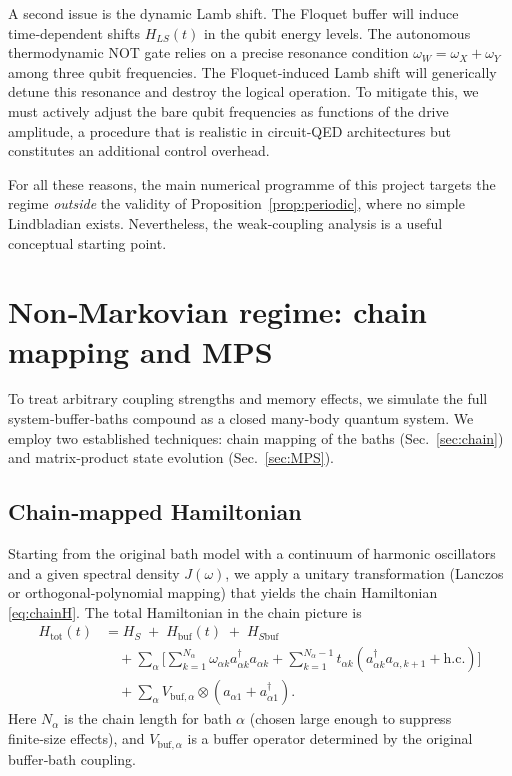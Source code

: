 \documentclass[11pt,a4paper]{article}
\theoremstyle{plain}
\theoremstyle{definition}
\theoremstyle{remark}
\begin{document}
A second issue is the dynamic Lamb shift. The Floquet buffer will induce time‑dependent shifts $H_{LS}(t)$ in the qubit energy levels. The autonomous thermodynamic NOT gate relies on a precise resonance condition $\omega_W = \omega_X + \omega_Y$ among three qubit frequencies. The Floquet‑induced Lamb shift will generically detune this resonance and destroy the logical operation. To mitigate this, we must actively adjust the bare qubit frequencies as functions of the drive amplitude, a procedure that is realistic in circuit‑QED architectures but constitutes an additional control overhead.

For all these reasons, the main numerical programme of this project targets the regime \emph{outside} the validity of Proposition~\ref{prop:periodic}, where no simple Lindbladian exists. Nevertheless, the weak‑coupling analysis is a useful conceptual starting point.

\section{Non‑Markovian regime: chain mapping and MPS}\label{sec:nonMarkovian}
To treat arbitrary coupling strengths and memory effects, we simulate the full system‑buffer‑baths compound as a closed many‑body quantum system. We employ two established techniques: chain mapping of the baths (Sec.~\ref{sec:chain}) and matrix‑product state evolution (Sec.~\ref{sec:MPS}).

\subsection{Chain‑mapped Hamiltonian}
Starting from the original bath model with a continuum of harmonic oscillators and a given spectral density $J(\omega)$, we apply a unitary transformation (Lanczos or orthogonal‑polynomial mapping) that yields the chain Hamiltonian \eqref{eq:chainH}. The total Hamiltonian in the chain picture is
\begin{equation}\label{eq:total_chain}
\begin{aligned}
H_{\text{tot}}(t) &= H_S \;+\; H_{\text{buf}}(t) \;+\; H_{S\text{buf}} \\
&\quad + \sum_{\alpha} \Big[ \sum_{k=1}^{N_\alpha} \omega_{\alpha k} a_{\alpha k}^\dagger a_{\alpha k}
   + \sum_{k=1}^{N_\alpha-1} t_{\alpha k} (a_{\alpha k}^\dagger a_{\alpha,k+1} + \text{h.c.}) \Big] \\
&\quad + \sum_{\alpha} V_{\text{buf},\alpha} \otimes (a_{\alpha 1} + a_{\alpha 1}^\dagger).
\end{aligned}
\end{equation}
Here $N_\alpha$ is the chain length for bath $\alpha$ (chosen large enough to suppress finite‑size effects), and $V_{\text{buf},\alpha}$ is a buffer operator determined by the original buffer‑bath coupling.
\end{document}
